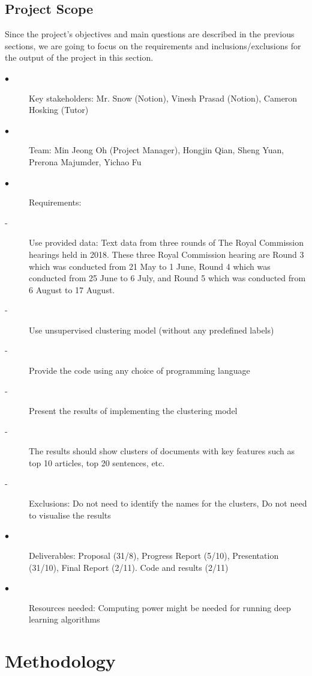 \documentclass[12pt]{article}
\begin{document}
\subsection{Project Scope}
Since the project’s objectives and main questions are described in the previous sections, we are going to focus on the requirements and inclusions/exclusions for the output of the project in this section. 
\begin{description}

\item[$\bullet$ ] Key stakeholders: Mr. Snow (Notion), Vinesh Prasad (Notion), Cameron Hosking (Tutor) 
\item[$\bullet$ ] Team: Min Jeong Oh (Project Manager), Hongjin Qian, Sheng Yuan, Prerona Majumder, Yichao Fu
\item[$\bullet$ ] Requirements:
	
\item[ - ] Use provided data: Text data from three rounds of The Royal Commission hearings held in 2018. These three Royal Commission hearing are Round 3 which was conducted from 21 May to 1 June, Round 4 which was conducted from 25 June to 6 July, and Round 5 which was conducted from 6 August to 17 August. 
\item[ - ]Use unsupervised clustering model (without any predefined labels)
\item[ - ]Provide the code using any choice of programming language
\item[ - ]Present the results of implementing the clustering model
\item[ - ]The results should show clusters of documents with key features such as top 10 articles, top 20 sentences, etc.
\item[ - ]Exclusions: Do not need to identify the names for the clusters, Do not need to visualise the results




\item[$\bullet$ ] Deliverables: Proposal (31/8), Progress Report (5/10), Presentation (31/10), Final Report (2/11). Code and results (2/11)
\item[$\bullet$ ] Resources needed: Computing power might be needed for running deep learning algorithms

\end{description}

\section{Methodology}
\end{document}
